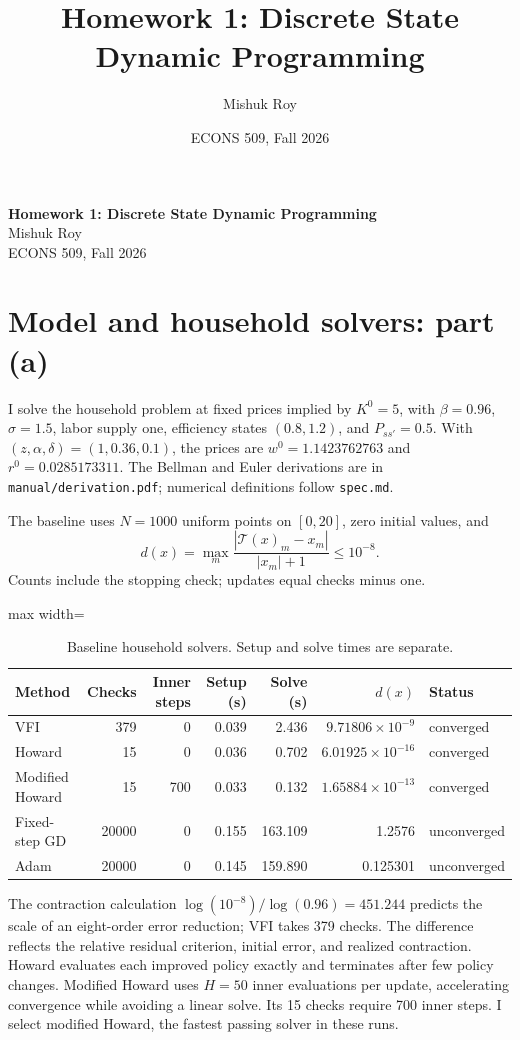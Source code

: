 \documentclass[10pt]{article}
\title{Homework 1: Discrete State Dynamic Programming}
\author{Mishuk Roy}
\date{ECONS 509, Fall 2026}
\begin{document}
\begin{center}{\Large\bfseries Homework 1: Discrete State Dynamic Programming}\\[6pt]Mishuk Roy\\[3pt]ECONS 509, Fall 2026\end{center}
\section{Model and household solvers: part (a)}
I solve the household problem at fixed prices implied by $K^0=5$, with
$\beta=0.96$, $\sigma=1.5$, labor supply one, efficiency states $(0.8,1.2)$,
and $P_{ss'}=0.5$. With $(z,\alpha,\delta)=(1,0.36,0.1)$, the prices are
$w^0=1.1423762763$ and $r^0=0.0285173311$.
The Bellman and Euler derivations are in \texttt{manual/derivation.pdf}; numerical definitions follow \texttt{spec.md}.

The baseline uses $N=1000$ uniform points on $[0,20]$, zero initial values, and
\[
d(x)=\max_m\frac{|\mathcal T(x)_m-x_m|}{|x_m|+1}\leq10^{-8}.
\]
Counts include the stopping check; updates equal checks minus one.
\begin{table}[H]\centering\small
\caption{Baseline household solvers. Setup and solve times are separate.}\label{tab:solvers}
\begin{adjustbox}{max width=\linewidth}
\begin{tabular}{lrrrrrl}
\toprule
Method & Checks & Inner steps & Setup (s) & Solve (s) & $d(x)$ & Status \\
\midrule
VFI & 379 & 0 & 0.039 & 2.436 & $9.71806\times10^{-9}$ & converged \\
Howard & 15 & 0 & 0.036 & 0.702 & $6.01925\times10^{-16}$ & converged \\
Modified Howard & 15 & 700 & 0.033 & 0.132 & $1.65884\times10^{-13}$ & converged \\
Fixed-step GD & 20000 & 0 & 0.155 & 163.109 & 1.2576 & unconverged \\
Adam & 20000 & 0 & 0.145 & 159.890 & 0.125301 & unconverged \\
\bottomrule
\end{tabular}
\end{adjustbox}\end{table}
The contraction calculation $\log(10^{-8})/\log(0.96)=451.244$ predicts the scale
of an eight-order error reduction; VFI takes 379 checks. The difference reflects
the relative residual criterion, initial error, and realized contraction.
Howard evaluates each improved policy exactly and terminates after few policy
changes. Modified Howard uses $H=50$ inner evaluations per update, accelerating
convergence while avoiding a linear solve. Its 15 checks require 700 inner steps.
I select modified Howard, the fastest passing solver in these runs.
\end{document}
